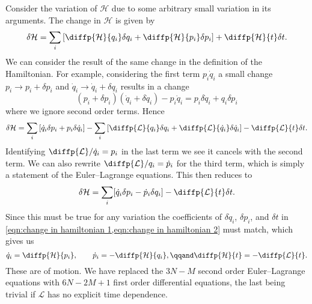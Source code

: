 \documentclass[fleqn]{NotesClass}
\newcommand*{\lagrangian}{\mathcal{L}}
\newcommand*{\hamiltonian}{\mathcal{H}}
\begin{document}
    Consider the variation of \(\hamiltonian\) due to some arbitrary small variation in its arguments.
    The change in \(\hamiltonian\) is given by
    \begin{equation}\label{eqn:change in hamiltonian 1}
        \delta\hamiltonian = \sum_{i} \left[ \diffp{\hamiltonian}{q_i} \delta q_i + \diffp{\hamiltonian}{p_i}\delta p_i \right] + \diffp{\hamiltonian}{t}\delta t.
    \end{equation}
    We can consider the result of the same change in the definition of the Hamiltonian.
    For example, considering the first term \(p_i\dot{q}_i\) a small change \(p_i \to p_i + \delta p_i\) and \(\dot{q}_i \to \dot{q}_i + \delta q_i\) results in a change
    \begin{equation}
        (p_i + \delta p_i)(\dot{q}_i + \delta\dot{q}_i) - p_i\dot{q}_i = p_i\delta\dot{q}_i + q_i\delta p_i
    \end{equation}
    where we ignore second order terms.
    Hence
    \begin{equation}
        \delta\hamiltonian = \sum_{i} \left[ \dot{q}_i\delta p_i + p_i\delta\dot{q}_i \right] - \sum_{i} \left[ \diffp{\lagrangian}{q_i}\delta q_i + \diffp{\lagrangian}{\dot{q}_i} \delta \dot{q}_i \right] - \diffp{\lagrangian}{t}\delta t.
    \end{equation}
    Identifying \(\diffp{\lagrangian}/{\dot{q}_i} = p_i\) in the last term we see it cancels with the second term.
    We can also rewrite \(\diffp{\lagrangian}/{q_i} = \dot{p}_i\) for the third term, which is simply a statement of the Euler--Lagrange equations.
    This then reduces to
    \begin{equation}\label{eqn:change in hamiltonian 2}
        \delta\hamiltonian = \sum_{i} [\dot{q}_i\delta p_i - \dot{p}_i\delta q_i] - \diffp{\lagrangian}{t}\delta t.
    \end{equation}
    Since this must be true for any variation the coefficients of \(\delta \dot{q}_i\), \(\delta p_i\), and \(\delta t\) in \cref{eqn:change in hamiltonian 1,eqn:change in hamiltonian 2} must match, which gives us
    \begin{equation}
        \dot{q}_i = \diffp{\hamiltonian}{p_i}, \qquad \dot{p}_i = - \diffp{\hamiltonian}{q_i}, \qqand \diffp{\hamiltonian}{t} = - \diffp{\lagrangian}{t}.
    \end{equation}
    These are  of motion.
    We have replaced the \(3N - M\) second order Euler--Lagrange equations with \(6N - 2M + 1\) first order differential equations, the last being trivial if \(\lagrangian\) has no explicit time dependence.
    
\end{document}
